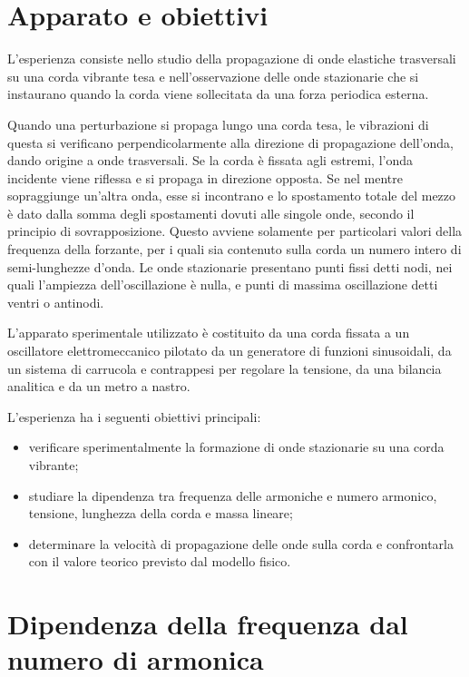 \section{Apparato e obiettivi}
L'esperienza consiste nello studio della propagazione di onde elastiche trasversali su una corda vibrante tesa e nell'osservazione delle onde stazionarie che si instaurano quando la corda viene sollecitata da una forza periodica esterna. 

Quando una perturbazione si propaga lungo una corda tesa, le vibrazioni di questa si verificano perpendicolarmente alla direzione di propagazione dell'onda, dando origine a onde trasversali. Se la corda è fissata agli estremi, l'onda incidente viene riflessa e si propaga in direzione opposta. Se nel mentre sopraggiunge un'altra onda, esse si incontrano e lo spostamento totale del mezzo è dato dalla somma degli spostamenti dovuti alle singole onde, secondo il principio di sovrapposizione. Questo avviene solamente per particolari valori della frequenza della forzante, per i quali sia contenuto sulla corda un numero intero di semi-lunghezze d'onda. Le onde stazionarie presentano punti fissi detti nodi, nei quali l'ampiezza dell'oscillazione è nulla, e punti di massima oscillazione detti ventri o antinodi.

L'apparato sperimentale utilizzato è costituito da una corda fissata a un oscillatore elettromeccanico pilotato da un generatore di funzioni sinusoidali, da un sistema di carrucola e contrappesi per regolare la tensione, da una bilancia analitica e da un metro a nastro. 

L'esperienza ha i seguenti obiettivi principali:

\begin{itemize}
    \item verificare sperimentalmente la formazione di onde stazionarie su una corda vibrante;
    \item studiare la dipendenza tra frequenza delle armoniche e numero armonico, tensione, lunghezza della corda e massa lineare;
    \item determinare la velocità di propagazione delle onde sulla corda e confrontarla con il valore teorico previsto dal modello fisico.
\end{itemize}
\newpage



\section{Dipendenza della frequenza dal numero di armonica}

